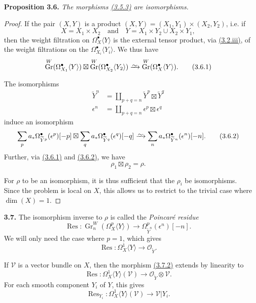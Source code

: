 \documentclass{report}
\newenvironment{itenv}[1]
  {\phantomsection\par\medskip\noindent\textbf{#1.}\itshape}
  {\par\medskip}
\newenvironment{rmenv}[1]
  {\phantomsection\par\medskip\noindent\textbf{#1.}\rmfamily}
  {\par\medskip}
\renewcommand{\cal}[1]{{\mathcal{#1}}}
\newcommand{\simto}{\xrightarrow{\raisebox{-0.7ex}[0ex][0ex]{$\sim$}}}
\DeclareMathOperator{\Gr}{Gr}
\DeclareMathOperator{\Res}{Res}
\newcommand{\oldpage}[1]{\marginpar{\footnotesize$\Big\vert$ \textit{p.~#1}}}
\begin{document}
\begin{itenv}{Proposition 3.6}
\label{II.3.6}
  The morphisms \hyperref[II.3.5.3]{(3.5.3)} are isomorphisms.
\end{itenv}

\begin{proof}
  If the pair $(X,Y)$ is a product $(X,Y)=(X_1,Y_1)\times(X_2,Y_2)$, i.e. if
  \[
    X = X_1\times X_2
    \quad\mbox{and}\quad
    Y = X_1\times Y_2 \cup X_2\times Y_1,
  \]
\oldpage{77}
  then the weight filtration on $\Omega_X^\bullet\langle Y\rangle$ is the external tensor product, via \hyperref[II.3.2]{(3.2.iii)}, of the weight filtrations on the $\Omega_{X_i}^\bullet\langle Y_i\rangle$.
  We thus have
  \[
  \label{II.3.6.1}
    \Gr^W(\Omega_{X_1}^\bullet\langle Y\rangle) \boxtimes \Gr^W(\Omega_{X_2}^\bullet\langle Y_2\rangle)
    \simto \Gr^W(\Omega_X^\bullet\langle Y\rangle).
  \tag{3.6.1}
  \]

  The isomorphisms
  \[
    \begin{aligned}
      \widetilde{Y}^n
      &= \coprod_{p+q=n} \widetilde{Y}^p\boxtimes\widetilde{Y}^q
    \\\epsilon^n
      &= \coprod_{p+q=n} \epsilon^p\boxtimes\epsilon^q
    \end{aligned}
  \]
  induce an isomorphism
  \[
  \label{II.3.6.2}
    \sum_p a_*\Omega_{\widetilde{Y}^p}^\bullet(\epsilon^p)[-p]
    \boxtimes
    \sum_q a_*\Omega_{\widetilde{Y}^q}^\bullet(\epsilon^q)[-q]
    \simto
    \sum_n a_*\Omega_{\widetilde{Y}^n}^\bullet(\epsilon^n)[-n].
  \tag{3.6.2}
  \]
  Further, via \hyperref[II.3.6.1]{(3.6.1)} and \hyperref[II.3.6.2]{(3.6.2)}, we have
  \[
  \label{II.3.6.3}
    \rho_1\boxtimes\rho_2 = \rho.
  \tag{3.6.3}
  \]

  For $\rho$ to be an isomorphism, it is thus sufficient that the $\rho_i$ be isomorphisms.
  Since the problem is local on $X$, this allows us to restrict to the trivial case where $\dim(X)=1$.
\end{proof}

\begin{rmenv}{3.7}
\label{II.3.7}
  The isomorphism inverse to $\rho$ is called the \emph{Poincar\'{e} residue}
  \[
  \label{II.3.7.1}
    \Res\colon \Gr_n^W(\Omega_X^p\langle Y\rangle) \to \Omega_{\widetilde{Y}^n}^p(\epsilon^n)[-n].
  \tag{3.7.1}
  \]
  We will only need the case where $p=1$, which gives
  \[
  \label{II.3.7.2}
    \Res\colon \Omega_X^1\langle Y\rangle \to \cal{O}_{\widetilde{Y}}.
  \tag{3.7.2}
  \]

  If $\cal{V}$ is a vector bundle on $X$, then the morphism \hyperref[II.3.7.2]{(3.7.2)} extends by linearity to
  \[
  \label{II.3.7.3}
    \Res\colon \Omega_X^1\langle Y\rangle(\cal{V}) \to \cal{O}_{\widetilde{Y}}\otimes\cal{V}.
  \tag{3.7.3}
  \]
  For each smooth component $Y_i$ of $Y$, this gives
\oldpage{78}
  \[
  \label{II.3.7.4}
    \Res_{Y_i}\colon \Omega_X^1\langle Y\rangle(\cal{V}) \to \cal{V}|Y_i.
  \tag{3.7.4}
  \]
\end{rmenv}
\end{document}
